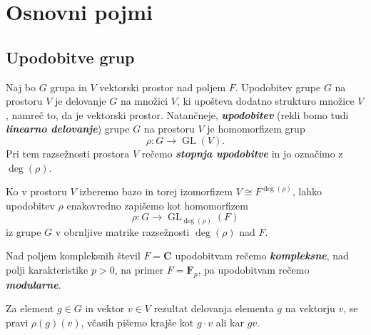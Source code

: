 \documentclass[11pt]{book}
\def\CC{\mathbf{C}}
\def\FF{\mathbf{F}}
\DeclareMathOperator\GL{GL}
\def\definicija{\color{rdeca}\bf\em}
\theoremstyle{definition}
\theoremstyle{zgled}
\theoremstyle{odprtproblem}
\theoremstyle{domacanaloga}
\theoremstyle{izrek}
\begin{document}
\section{Osnovni pojmi}

\subsection{Upodobitve grup}

Naj bo $G$ grupa in $V$ vektorski prostor nad poljem $F$. Upodobitev grupe $G$ na prostoru $V$ je delovanje $G$ na množici $V$, ki upošteva dodatno strukturo množice $V$, namreč to, da je vektorski prostor. Natančneje, {\definicija upodobitev} (rekli bomo tudi {\definicija linearno delovanje}) grupe $G$ na prostoru $V$ je homomorfizem grup
\[
    \rho \colon G \to \GL(V).
\]
Pri tem razsežnosti prostora $V$ rečemo {\definicija stopnja upodobitve} in jo označimo z $\deg(\rho)$. 

Ko v prostoru $V$ izberemo bazo in torej izomorfizem $V \cong F^{\deg(\rho)}$, lahko upodobitev $\rho$ enakovredno zapišemo kot homomorfizem
\[
    \rho \colon G \to \textstyle \GL_{\deg(\rho)}(F)
\]
iz grupe $G$ v obrnljive matrike razsežnosti $\deg(\rho)$ nad $F$.

Nad poljem kompleksnih števil $F = \CC$ upodobitvam rečemo {\definicija kompleksne}, nad polji karakteristike $p > 0$, na primer $F = \FF_p$, pa upodobitvam rečemo {\definicija modularne}. 

Za element $g \in G$ in vektor $v \in V$ rezultat delovanja elementa $g$ na vektorju $v$, se pravi $\rho(g)(v)$, včasih pišemo krajše kot $g \cdot v$ ali kar $gv$.
\end{document}
